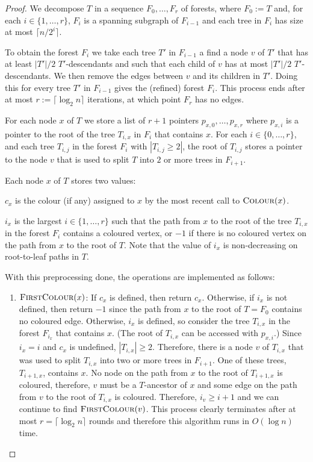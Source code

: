 \documentclass[kpfonts]{patmorin}
\let\ge\geqslant
\begin{document}
\begin{proof}
    We decompose $T$ in a sequence $F_0,\ldots,F_r$ of forests, where $F_0:=T$ and, for each $i\in\{1,\ldots,r\}$, $F_i$ is a spanning subgraph of $F_{i-1}$ and each tree in $F_i$ has size at most $\lceil n/2^i\rceil$.

    To obtain the forest $F_i$ we take each tree $T'$ in $F_{i-1}$
    a find a node $v$ of $T'$ that has at least $|T'|/2$ $T'$-descendants and such that each child of $v$ has at most $|T'|/2$ $T'$-descendants.  We then remove the edges between $v$ and its children in $T'$.  Doing this for every tree $T'$ in $F_{i-1}$ gives the (refined) forest $F_i$.  This process ends after at most $r:=\lceil\log_2 n\rceil$ iterations, at which point $F_r$ has no edges.  
    
    For each node $x$ of $T$ we store a list of $r+1$ pointers $p_{x,0},\ldots,p_{x,r}$ where $p_{x,i}$ is a pointer to the root of the tree $T_{i,x}$ in $F_i$ that contains $x$.  For each $i\in\{0,\ldots,r\}$, and each tree $T_{i,j}$ in the forest $F_i$ with $|T_{i,j}\ge 2|$, the root of $T_{i,j}$ stores a pointer to the node $v$ that is used to split $T$ into $2$ or more trees in $F_{i+1}$.

    Each node $x$ of $T$ stores two values:
    \begin{compactenum}
      \item $c_x$ is the colour (if any) assigned to $x$ by the most recent call to $\textsc{Colour}(x)$.
      \item $i_x$ is the largest $i\in\{1,\ldots,r\}$ such that the path from $x$ to the root of the tree $T_{i,x}$ in the forest $F_i$ contains a coloured vertex, or $-1$ if there is no coloured vertex on the path from $x$ to the root of $T$.  Note that the value of $i_x$ is non-decreasing on root-to-leaf paths in $T$.
    \end{compactenum}

    With this preprocessing done, the operations are implemented as follows:
    \begin{enumerate}
    \item $\textsc{FirstColour}(x)$:  If $c_x$ is defined, then return $c_x$.   Otherwise, if $i_x$ is not defined, then return $-1$ since the path from $x$ to the root of $T=F_0$ contains no coloured edge.  Otherwise, $i_x$ is defined, so consider the tree $T_{i,x}$ in the forest $F_{i_x}$ that contains $x$.  (The root of $T_{i,x}$ can be accessed with $p_{x,i}$.)  Since $i_x=i$ and $c_x$ is undefined, $|T_{i,x}|\ge 2$.  Therefore, there is a node $v$ of $T_{i,x}$ that was used to split $T_{i,x}$ into two or more trees in $F_{i+1}$.  One of these trees, $T_{i+1,x}$, contains $x$.  No node on the path from $x$ to the root of $T_{i+1,x}$ is coloured, therefore, $v$ must be a $T$-ancestor of $x$ and some edge on the path from $v$ to the root of $T_{i,x}$ is coloured.  Therefore, $i_v\ge i+1$ and we can continue to find $\textsc{FirstColour}(v)$.  This process clearly terminates after at most $r=\lceil\log_2 n\rceil$ rounds and therefore this algorithm runs in $O(\log n)$ time.


\end{enumerate}
\end{proof}
\end{document}
